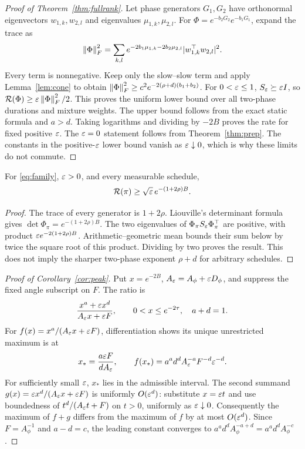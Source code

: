 \begin{proof}[Proof of Theorem~\ref{thm:fullrank}]
Let phase generators $G_1,G_2$ have orthonormal eigenvectors $w_{1,k},w_{2,l}$ and eigenvalues $\mu_{1,k},\mu_{2,l}$. For $\Phi=e^{-b_2G_2}e^{-b_1G_1}$, expand the trace as
\begin{equation}
 \left\lVert\Phi\right\rVert_F^2=\sum_{k,l}
 e^{-2b_1\mu_{1,k}-2b_2\mu_{2,l}}
 |w_{1,k}^\top w_{2,l}|^2.\label{eq:nonnegative_expansion}
\end{equation}
Every term is nonnegative. Keep only the slow--slow term and apply Lemma~\ref{lem:cone} to obtain
$\left\lVert\Phi\right\rVert_F^2\ge c^2e^{-2(\rho+d)(b_1+b_2)}$.
For $0<\varepsilon\le1$, $S_\varepsilon\succeq\varepsilon I$, so $\mathcal R(\Phi)\ge\varepsilon\left\lVert\Phi\right\rVert_F^2/2$. This proves the uniform lower bound over all two-phase durations and mixture weights. The upper bound follows from the exact static formula and $a>d$. Taking logarithms and dividing by $-2B$ proves the rate for fixed positive $\varepsilon$. The $\varepsilon=0$ statement follows from Theorem~\ref{thm:prep}. The constants in the positive-$\varepsilon$ lower bound vanish as $\varepsilon\downarrow0$, which is why these limits do not commute.
\end{proof}

\begin{proposition}\label{prop:volume}
For \eqref{eq:family}, $\varepsilon>0$, and every measurable schedule,
\begin{equation}
 \mathcal R(\pi)\ge\sqrt{\varepsilon}\,e^{-(1+2\rho)B}.
\end{equation}
\end{proposition}
\begin{proof}
The trace of every generator is $1+2\rho$. Liouville's determinant formula gives $\det\Phi_\pi=e^{-(1+2\rho)B}$. The two eigenvalues of $\Phi_\pi S_\varepsilon\Phi_\pi^\top$ are positive, with product $\varepsilon e^{-2(1+2\rho)B}$. Arithmetic--geometric mean bounds their sum below by twice the square root of this product. Dividing by two proves the result. This does not imply the sharper two-phase exponent $\rho+d$ for arbitrary schedules.
\end{proof}

\begin{proof}[Proof of Corollary~\ref{cor:peak}]
Put $x=e^{-2B}$, $A_\varepsilon=A_\phi+\varepsilon D_\phi$, and suppress the fixed angle subscript on $F$. The ratio is
\[
 \frac{x^a+\varepsilon x^d}{A_\varepsilon x+\varepsilon F},\qquad
 0<x\le e^{-2\tau},\quad a+d=1.
\]
For $f(x)=x^a/(A_\varepsilon x+\varepsilon F)$, differentiation shows its unique unrestricted maximum is at
\[
 x_*=\frac{a\varepsilon F}{d A_\varepsilon},\qquad
 f(x_*)=a^ad^dA_\varepsilon^{-a}F^{-d}\varepsilon^{-d}.
\]
For sufficiently small $\varepsilon$, $x_*$ lies in the admissible interval. The second summand $g(x)=\varepsilon x^d/(A_\varepsilon x+\varepsilon F)$ is uniformly $O(\varepsilon^d)$: substitute $x=\varepsilon t$ and use boundedness of $t^d/(A_\varepsilon t+F)$ on $t>0$, uniformly as $\varepsilon\downarrow0$. Consequently the maximum of $f+g$ differs from the maximum of $f$ by at most $O(\varepsilon^d)$. Since $F=A_\phi^{-1}$ and $a-d=c$, the leading constant converges to $a^ad^dA_\phi^{-a+d}=a^ad^dA_\phi^{-c}$.
\end{proof}

